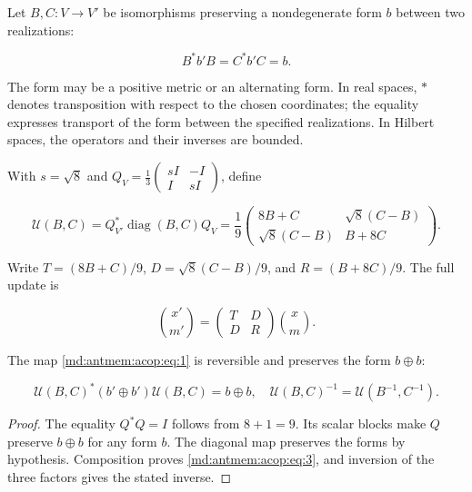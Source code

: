 Let \(B,C:V\to V'\) be isomorphisms preserving a nondegenerate form \(b\) between two realizations:

\[
B^*b'B=C^*b'C=b.
\]

The form may be a positive metric or an alternating form. In real spaces, \(*\) denotes transposition with respect to the chosen coordinates; the equality expresses transport of the form between the specified realizations. In Hilbert spaces, the operators and their inverses are bounded.

With \(s=\sqrt8\) and \(Q_V=\frac13\left(\begin{smallmatrix}sI&-I\\I&sI\end{smallmatrix}\right)\), define

\begin{equation}
\boxed{
\mathcal U(B,C)=Q_{V'}^*\operatorname{diag}(B,C)Q_V
=\frac19\begin{pmatrix}8B+C&\sqrt8(C-B)\\\sqrt8(C-B)&B+8C\end{pmatrix}.}
\label{md:antmem:acop:eq:1}
\end{equation}

Write \(T=(8B+C)/9\), \(D=\sqrt8(C-B)/9\), and \(R=(B+8C)/9\). The full update is

\begin{equation}
\binom{x'}{m'}=\begin{pmatrix}T&D\\D&R\end{pmatrix}\binom{x}{m}.
\label{md:antmem:acop:eq:2}
\end{equation}

\begin{theorem}
The map \eqref{md:antmem:acop:eq:1} is reversible and preserves the form \(b\oplus b\):

\begin{equation}
\mathcal U(B,C)^*(b'\oplus b')\mathcal U(B,C)=b\oplus b,
\quad\mathcal U(B,C)^{-1}=\mathcal U(B^{-1},C^{-1}).
\label{md:antmem:acop:eq:3}
\end{equation}
\end{theorem}

\begin{proof}
The equality \(Q^*Q=I\) follows from \(8+1=9\). Its scalar blocks make \(Q\) preserve \(b\oplus b\) for any form \(b\). The diagonal map preserves the forms by hypothesis. Composition proves \eqref{md:antmem:acop:eq:3}, and inversion of the three factors gives the stated inverse.
\end{proof}


